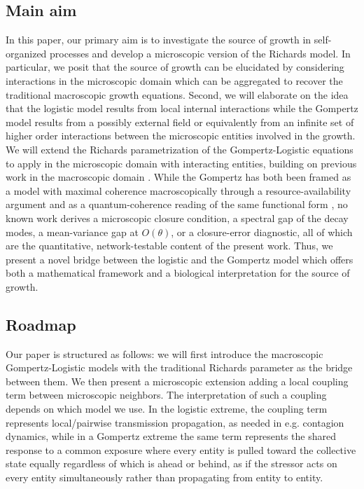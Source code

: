 \documentclass{article}
\begin{document}
\subsection{Main aim}
In this paper, our primary aim is to investigate the source of growth in self-organized processes and develop a microscopic version of the Richards model. In particular, we posit that the source of growth can be elucidated by considering interactions in the microscopic domain which can be aggregated to recover the traditional macroscopic growth equations. Second, we will elaborate on the idea that the logistic model results from local internal interactions while the Gompertz model results from a possibly external field or equivalently from an infinite set of higher order interactions between the microscopic entities involved in the growth. We will extend the Richards parametrization of the Gompertz-Logistic equations to apply in the microscopic domain with interacting entities, building on previous work in the macroscopic domain \citep{tjorve2017use,wang2012richards}. While the Gompertz has both been framed as a model with maximal coherence macroscopically through a resource-availability argument \citep{petroni2020logistic} and as a quantum-coherence reading of the same functional form \citep{molski2003coherent}, no known work derives a microscopic closure condition, a spectral gap of the decay modes, a mean-variance gap at $O(\theta)$, or a closure-error diagnostic, all of which are the quantitative, network-testable content of the present work. Thus, we present a novel bridge between the logistic and the Gompertz model which offers both a mathematical framework and a biological interpretation for the source of growth. 


\subsection{Roadmap}
Our paper is structured as follows: we will first introduce the macroscopic Gompertz-Logistic models with the traditional Richards parameter as the bridge between them. We then present a microscopic extension adding a local coupling term between microscopic neighbors. The interpretation of such a coupling depends on which model we use. In the logistic extreme, the coupling term represents local/pairwise transmission propagation, as needed in e.g. contagion dynamics, while in a Gompertz extreme the same term represents the shared response to a common exposure where every entity is pulled toward the collective state equally regardless of which is ahead or behind, as if the stressor acts on every entity simultaneously rather than propagating from entity to entity.
\end{document}
